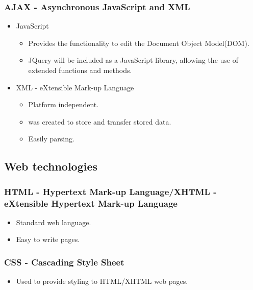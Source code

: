 \documentclass[12pt, oneside]{article}
\begin{document}
		\subsubsection{AJAX - Asynchronous JavaScript and XML}
			\begin{itemize}
				\item JavaScript
					\begin{itemize}
						\item Provides the functionality to edit the Document Object Model(DOM).
						\item JQuery will be included as a JavaScript library, allowing the use of extended functions and methods.
					\end{itemize}
				\item XML - eXtensible Mark-up Language
					\begin{itemize}
						\item Platform independent.
						\item was created to store and transfer stored data.
						\item Easily parsing.
					\end{itemize}
			\end{itemize}
	\subsection{Web technologies}
		
		\subsubsection{HTML - Hypertext Mark-up Language/XHTML - eXtensible Hypertext Mark-up Language}	
			\begin{itemize}
				\item Standard web language.
				\item Easy to write pages.
			\end{itemize}
		\subsubsection{CSS - Cascading Style Sheet}
			\begin{itemize}
				\item Used to provide styling to HTML/XHTML web pages.
			\end{itemize}
\end{document}
